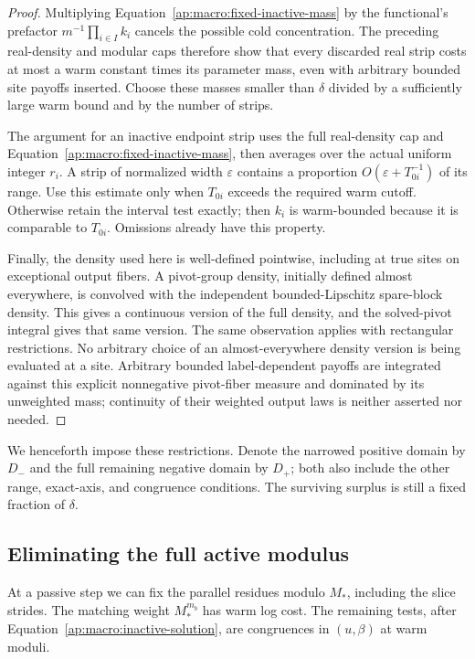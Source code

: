 \begin{proof}
Multiplying Equation~\eqref{ap:macro:fixed-inactive-mass} by the
functional's prefactor $m^{-1}\prod_{i\in I}k_i$ cancels the possible
cold concentration.  The preceding real-density and modular caps
therefore show that every discarded real strip costs at most a warm
constant times its parameter mass, even with arbitrary bounded site
payoffs inserted.  Choose these masses smaller than $\delta$ divided
by a sufficiently large warm bound and by the number of strips.

The argument for an inactive endpoint strip uses the full real-density
cap and Equation~\eqref{ap:macro:fixed-inactive-mass}, then averages
over the actual uniform integer $r_i$.  A strip of normalized width
$\varepsilon$ contains a proportion
$O(\varepsilon+T_{0i}^{-1})$ of its range.  Use this estimate only when
$T_{0i}$ exceeds the required warm cutoff.  Otherwise retain the
interval test exactly; then $k_i$ is warm-bounded because it is
comparable to $T_{0i}$.  Omissions already have this property.

Finally, the density used here is well-defined pointwise, including at
true sites on exceptional output fibers.  A pivot-group density,
initially defined almost everywhere, is convolved with the independent
bounded-Lipschitz spare-block density.  This gives a continuous version
of the full density, and the solved-pivot integral gives that same
version.  The same observation applies with rectangular restrictions.
No arbitrary choice of an almost-everywhere density version is being
evaluated at a site.  Arbitrary bounded label-dependent payoffs are
integrated against this explicit nonnegative pivot-fiber measure and
dominated by its unweighted mass; continuity of their weighted output
laws is neither asserted nor needed.
\end{proof}

We henceforth impose these restrictions.  Denote the narrowed positive
domain by $D_-$ and the full remaining negative domain by $D_+$; both
also include the other range, exact-axis, and congruence conditions.
The surviving surplus is still a fixed fraction of $\delta$.

\subsection{Eliminating the full active modulus}

At a passive step we can fix the parallel residues modulo $M_*$,
including the slice strides.  The matching weight $M_*^{m_b}$ has
warm log cost.  The remaining tests, after
Equation~\eqref{ap:macro:inactive-solution}, are congruences in
$(u,\beta)$ at warm moduli.

